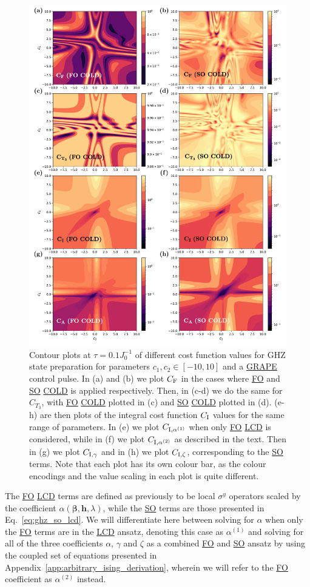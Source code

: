 \documentclass[a4paper,oneside,11pt]{book}
\newcommand{\betabb}{\boldsymbol{\beta}}
\newcommand{\hbb}{\boldsymbol{h}}
\newcommand{\sy}{\sigma^y}
\newcommand{\acrref}[1]{\hyperref[acr:#1]{#1}}
\begin{document}
\begin{figure}[t!]
    \centering
    \includegraphics[width=0.75\linewidth]{images/ghz_contour_integrals.png} \caption[Contour plots of cost function landscapes for GHZ state preparation in frustrated spin systems (integral cost function).]{Contour plots at $\tau = 0.1 J_0^{-1}$ of different cost function values for GHZ state preparation for parameters $c_1, c_2 \in [-10,10]$ and a \acrref{GRAPE} control pulse. In (a) and (b) we plot $C_{\rm F}$ in the cases where \acrref{FO} and \acrref{SO} \acrref{COLD} is applied respectively. Then, in (c-d) we do the same for $C_{T_3}$, with \acrref{FO} \acrref{COLD} plotted in (c) and \acrref{SO} \acrref{COLD} plotted in (d). (e-h) are then plots of the integral cost function $C_{\rm I}$ values for the same range of parameters. In (e) we plot $C_{\rm I, \alpha^{(1)}}$ when only \acrref{FO} \acrref{LCD} is considered, while in (f) we plot $C_{\rm I, \alpha^{(2)}}$ as described in the text. Then in (g) we plot $C_{\rm I, \gamma}$ and in (h) we plot $C_{\rm I, \zeta}$, corresponding to the \acrref{SO} terms. Note that each plot has its own colour bar, as the colour encodings and the value scaling in each plot is quite different.}\label{fig:ghz_contours}
\end{figure}

The \acrref{FO} \acrref{LCD} terms are defined as previously to be local $\sy$ operators scaled by the coefficient $\alpha(\betabb, \hbb, \lambda)$, while the \acrref{SO} terms are those presented in Eq.~\eqref{eq:ghz_so_lcd}. We will differentiate here between solving for $\alpha$ when only the \acrref{FO} terms are in the \acrref{LCD} ansatz, denoting this case as $\alpha^{(1)}$ and solving for all of the three coefficients $\alpha$, $\gamma$ and $\zeta$ as a combined \acrref{FO} and \acrref{SO} ansatz by using the coupled set of equations presented in Appendix~\ref{app:arbitrary_ising_derivation}, wherein we will refer to the \acrref{FO} coefficient as $\alpha^{(2)}$ instead.
\end{document}
